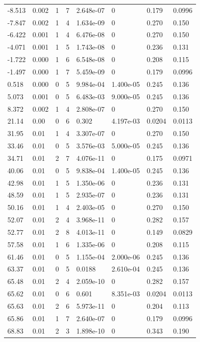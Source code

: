 \documentclass[preview]{standalone}
\begin{document}
{{\begin{tabular}{L{1.2cm}C{1.2cm} C{0.3cm}C{0.5cm} C{1.4cm}C{1.4cm} C{1.4cm}C{1.4cm}}
  -8.513  &  0.002  & 1     &  7 &  2.648e-07  & 0  & 0.179 &  0.0996   \\ 
  -7.847  &  0.002  & 1     &  4 &  1.634e-09  & 0  & 0.270 &  0.150   \\ 
  -6.422  &  0.001  & 1     &  4 &  6.476e-08  & 0  & 0.270 &  0.150   \\ 
  -4.071  &  0.001  & 1     &  5 &  1.743e-08  & 0  & 0.236 &  0.131   \\ 
  -1.722  &  0.000  & 1     &  6 &  6.548e-08  & 0  & 0.208 &  0.115   \\ 
  -1.497  &  0.000  & 1     &  7 &  5.459e-09  & 0  & 0.179 &  0.0996   \\ 
  0.518  &  0.000  & 0     &  5 &  9.984e-04  & 1.400e-05  & 0.245 &  0.136   \\ 
  5.073  &  0.001  & 0     &  5 &  6.483e-03  & 9.000e-05  & 0.245 &  0.136   \\ 
  8.372  &  0.002  & 1     &  4 &  2.808e-07  & 0  & 0.270 &  0.150   \\ 
  21.14  &  0.00  & 0     &  6 &  0.302  & 4.197e-03  & 0.0204 &  0.0113   \\ 
  31.95  &  0.01  & 1     &  4 &  3.307e-07  & 0  & 0.270 &  0.150   \\ 
  33.46  &  0.01  & 0     &  5 &  3.576e-03  & 5.000e-05  & 0.245 &  0.136   \\ 
  34.71  &  0.01  & 2     &  7 &  4.076e-11  & 0  & 0.175 &  0.0971   \\ 
  40.06  &  0.01  & 0     &  5 &  9.838e-04  & 1.400e-05  & 0.245 &  0.136   \\ 
  42.98  &  0.01  & 1     &  5 &  1.350e-06  & 0  & 0.236 &  0.131   \\ 
  48.59  &  0.01  & 1     &  5 &  2.935e-07  & 0  & 0.236 &  0.131   \\ 
  50.16  &  0.01  & 1     &  4 &  2.403e-05  & 0  & 0.270 &  0.150   \\ 
  52.07  &  0.01  & 2     &  4 &  3.968e-11  & 0  & 0.282 &  0.157   \\ 
  52.77  &  0.01  & 2     &  8 &  4.013e-11  & 0  & 0.149 &  0.0829   \\ 
  57.58  &  0.01  & 1     &  6 &  1.335e-06  & 0  & 0.208 &  0.115   \\ 
  61.46  &  0.01  & 0     &  5 &  1.155e-04  & 2.000e-06  & 0.245 &  0.136   \\ 
  63.37  &  0.01  & 0     &  5 &  0.0188  & 2.610e-04  & 0.245 &  0.136   \\ 
  65.48  &  0.01  & 2     &  4 &  2.059e-10  & 0  & 0.282 &  0.157   \\ 
  65.62  &  0.01  & 0     &  6 &  0.601  & 8.351e-03  & 0.0204 &  0.0113   \\ 
  65.63  &  0.01  & 2     &  6 &  5.973e-11  & 0  & 0.204 &  0.113   \\ 
  65.86  &  0.01  & 1     &  7 &  2.640e-07  & 0  & 0.179 &  0.0996   \\ 
  68.83  &  0.01  & 2     &  3 &  1.898e-10  & 0  & 0.343 &  0.190   \\ 
\hline 
\end{tabular} 

}}
\end{document}
